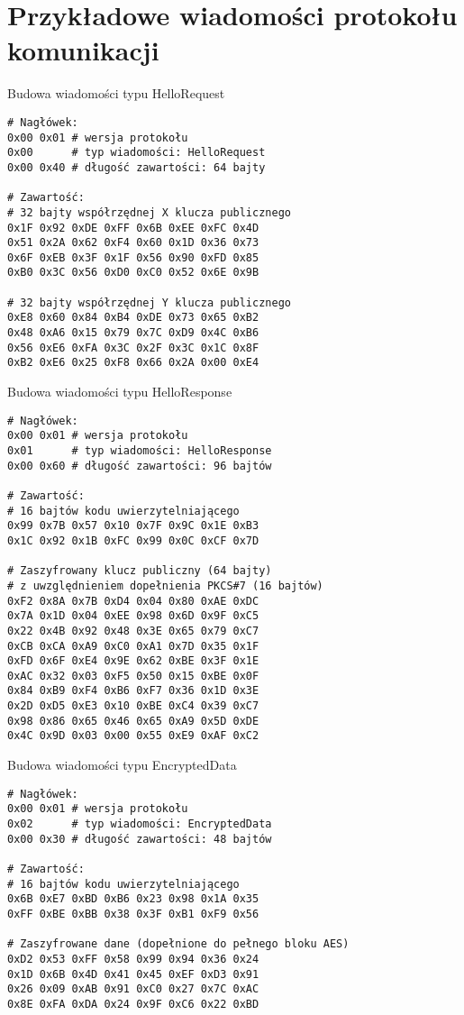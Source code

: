 \chapter{Przykładowe wiadomości protokołu komunikacji}
\label{app:samplerecords}

\begin{table}[h]
\centering
\caption{Budowa wiadomości typu HelloRequest}
\begin{BVerbatim}
# Nagłówek:
0x00 0x01 # wersja protokołu
0x00      # typ wiadomości: HelloRequest
0x00 0x40 # długość zawartości: 64 bajty

# Zawartość:
# 32 bajty współrzędnej X klucza publicznego
0x1F 0x92 0xDE 0xFF 0x6B 0xEE 0xFC 0x4D
0x51 0x2A 0x62 0xF4 0x60 0x1D 0x36 0x73
0x6F 0xEB 0x3F 0x1F 0x56 0x90 0xFD 0x85
0xB0 0x3C 0x56 0xD0 0xC0 0x52 0x6E 0x9B

# 32 bajty współrzędnej Y klucza publicznego
0xE8 0x60 0x84 0xB4 0xDE 0x73 0x65 0xB2
0x48 0xA6 0x15 0x79 0x7C 0xD9 0x4C 0xB6
0x56 0xE6 0xFA 0x3C 0x2F 0x3C 0x1C 0x8F
0xB2 0xE6 0x25 0xF8 0x66 0x2A 0x00 0xE4
\end{BVerbatim}
\label{fig:hellorequestsample}
\end{table}

\begin{table}
\centering
\caption{Budowa wiadomości typu HelloResponse}
\begin{BVerbatim}
# Nagłówek:
0x00 0x01 # wersja protokołu
0x01      # typ wiadomości: HelloResponse
0x00 0x60 # długość zawartości: 96 bajtów

# Zawartość:
# 16 bajtów kodu uwierzytelniającego
0x99 0x7B 0x57 0x10 0x7F 0x9C 0x1E 0xB3
0x1C 0x92 0x1B 0xFC 0x99 0x0C 0xCF 0x7D

# Zaszyfrowany klucz publiczny (64 bajty)
# z uwzględnieniem dopełnienia PKCS#7 (16 bajtów)
0xF2 0x8A 0x7B 0xD4 0x04 0x80 0xAE 0xDC
0x7A 0x1D 0x04 0xEE 0x98 0x6D 0x9F 0xC5
0x22 0x4B 0x92 0x48 0x3E 0x65 0x79 0xC7
0xCB 0xCA 0xA9 0xC0 0xA1 0x7D 0x35 0x1F
0xFD 0x6F 0xE4 0x9E 0x62 0xBE 0x3F 0x1E
0xAC 0x32 0x03 0xF5 0x50 0x15 0xBE 0x0F
0x84 0xB9 0xF4 0xB6 0xF7 0x36 0x1D 0x3E
0x2D 0xD5 0xE3 0x10 0xBE 0xC4 0x39 0xC7
0x98 0x86 0x65 0x46 0x65 0xA9 0x5D 0xDE
0x4C 0x9D 0x03 0x00 0x55 0xE9 0xAF 0xC2
\end{BVerbatim}
\label{fig:helloresponsesample}
\end{table}

\begin{table}
\centering
\caption{Budowa wiadomości typu EncryptedData}
\begin{BVerbatim}
# Nagłówek:
0x00 0x01 # wersja protokołu
0x02      # typ wiadomości: EncryptedData
0x00 0x30 # długość zawartości: 48 bajtów

# Zawartość:
# 16 bajtów kodu uwierzytelniającego
0x6B 0xE7 0xBD 0xB6 0x23 0x98 0x1A 0x35
0xFF 0xBE 0xBB 0x38 0x3F 0xB1 0xF9 0x56

# Zaszyfrowane dane (dopełnione do pełnego bloku AES)
0xD2 0x53 0xFF 0x58 0x99 0x94 0x36 0x24
0x1D 0x6B 0x4D 0x41 0x45 0xEF 0xD3 0x91
0x26 0x09 0xAB 0x91 0xC0 0x27 0x7C 0xAC
0x8E 0xFA 0xDA 0x24 0x9F 0xC6 0x22 0xBD
\end{BVerbatim}
\label{fig:encrypteddatasample}
\end{table}

